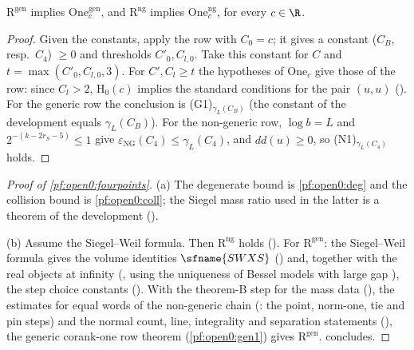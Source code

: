 \begin{lemma}\label{pf:open0:onerows}
$\mathrm{R}^{\mathrm{gen}}$ implies $\mathrm{One}^{\mathrm{gen}}_c$, and $\mathrm{R}^{\mathrm{ng}}$ implies $\mathrm{One}^{\mathrm{ng}}_c$, for every $c\in\R$.
\ 
\end{lemma}

\begin{proof}
Given the constants, apply the row with $C_0=c$; it gives a constant ($C_B$, resp.\ $C_4$) $\ge0$ and thresholds $C'_0,C_{l,0}$. Take this
constant for $C$ and $t=\max(C'_0,C_{l,0},3)$. For $C',C_l\ge t$ the hypotheses of $\mathrm{One}_c$ give those of the row: since $C_l>2$,
$\mathrm{H}_0(c)$ implies the standard conditions for the pair $(u,u)$ (). For the generic row
the conclusion is (G1)$_{\gamma_L(C_B)}$ (the constant of the development equals $\gamma_L(C_B)$). For the non-generic row,
$\log b=L$ and $2^{-(k-2r_S-5)}\le1$ give $\varepsilon_{\mathrm{NG}}(C_4)\le\gamma_L(C_4)$, and $dd(u)\ge0$, so
(N1)$_{\gamma_L(C_4)}$ holds.
\end{proof}

\begin{proof}[Proof of \cref{pf:open0:fourpoints}]
(a) The degenerate bound is \cref{pf:open0:deg} and the collision bound is \cref{pf:open0:coll}; the Siegel mass ratio used in the latter
is a theorem of the development ().

(b) Assume the Siegel--Weil formula. Then $\mathrm{R}^{\mathrm{ng}}$ holds (). For
$\mathrm{R}^{\mathrm{gen}}$: the Siegel--Weil formula gives the volume identities $\sfname{SWXS}$ ()
and, together with the real objects at infinity (, using the
uniqueness of Bessel models with large gap ), the step choice constants
(). With the theorem-B step for the mass data
(), the estimates for equal words of the non-generic chain
(: the point, norm-one, tie and pin steps) and the normal count,
line, integrality and separation statements (), the generic
corank-one row theorem (\cref{pf:open0:gen1}) gives $\mathrm{R}^{\mathrm{gen}}$.  concludes.
\end{proof}


